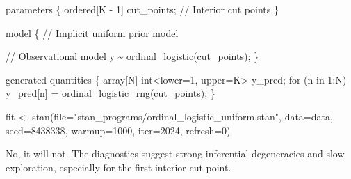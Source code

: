 \documentclass[
  letterpaper,
  DIV=11,
  numbers=noendperiod]{scrartcl}
\newenvironment{Shaded}{\begin{snugshade}}{\end{snugshade}}
\newcommand{\AttributeTok}[1]{\textcolor[rgb]{0.40,0.45,0.13}{#1}}
\newcommand{\CommentTok}[1]{\textcolor[rgb]{0.37,0.37,0.37}{#1}}
\newcommand{\ControlFlowTok}[1]{\textcolor[rgb]{0.00,0.23,0.31}{#1}}
\newcommand{\DataTypeTok}[1]{\textcolor[rgb]{0.68,0.00,0.00}{#1}}
\newcommand{\DecValTok}[1]{\textcolor[rgb]{0.68,0.00,0.00}{#1}}
\newcommand{\FunctionTok}[1]{\textcolor[rgb]{0.28,0.35,0.67}{#1}}
\newcommand{\KeywordTok}[1]{\textcolor[rgb]{0.00,0.23,0.31}{#1}}
\newcommand{\NormalTok}[1]{\textcolor[rgb]{0.00,0.23,0.31}{#1}}
\newcommand{\OtherTok}[1]{\textcolor[rgb]{0.00,0.23,0.31}{#1}}
\newcommand{\SpecialCharTok}[1]{\textcolor[rgb]{0.37,0.37,0.37}{#1}}
\newcommand{\StringTok}[1]{\textcolor[rgb]{0.13,0.47,0.30}{#1}}
\begin{document}
\begin{codelisting}
\begin{Shaded}
\begin{Highlighting}[]
\KeywordTok{parameters}\NormalTok{ \{}
  \DataTypeTok{ordered}\NormalTok{[K {-} }\DecValTok{1}\NormalTok{] cut\_points; }\CommentTok{// Interior cut points}
\NormalTok{\}}

\KeywordTok{model}\NormalTok{ \{}
  \CommentTok{// Implicit uniform prior model}

  \CommentTok{// Observational model}
\NormalTok{  y \textasciitilde{} ordinal\_logistic(cut\_points);}
\NormalTok{\}}

\KeywordTok{generated quantities}\NormalTok{ \{}
  \DataTypeTok{array}\NormalTok{[N] }\DataTypeTok{int}\NormalTok{\textless{}}\KeywordTok{lower}\NormalTok{=}\DecValTok{1}\NormalTok{, }\KeywordTok{upper}\NormalTok{=K\textgreater{} y\_pred;}
  \ControlFlowTok{for}\NormalTok{ (n }\ControlFlowTok{in} \DecValTok{1}\NormalTok{:N)}
\NormalTok{    y\_pred[n] = ordinal\_logistic\_rng(cut\_points);}
\NormalTok{\}}
\end{Highlighting}
\end{Shaded}

\end{codelisting}

\begin{Shaded}
\begin{Highlighting}[]
\NormalTok{fit }\OtherTok{\textless{}{-}} \FunctionTok{stan}\NormalTok{(}\AttributeTok{file=}\StringTok{"stan\_programs/ordinal\_logistic\_uniform.stan"}\NormalTok{,}
            \AttributeTok{data=}\NormalTok{data, }\AttributeTok{seed=}\DecValTok{8438338}\NormalTok{,}
            \AttributeTok{warmup=}\DecValTok{1000}\NormalTok{, }\AttributeTok{iter=}\DecValTok{2024}\NormalTok{, }\AttributeTok{refresh=}\DecValTok{0}\NormalTok{)}
\end{Highlighting}
\end{Shaded}

No, it will not. The diagnostics suggest strong inferential degeneracies
and slow exploration, especially for the first interior cut point.

\begin{Shaded}
\end{Shaded}
\end{document}
